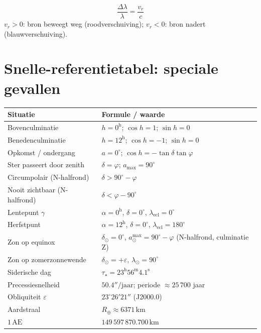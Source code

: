 \documentclass[11pt, a4paper]{article}
\newcommand{\graden}{^{\circ}}
\newcommand{\boogmin}{'}
\newcommand{\boogsec}{''}
\newcommand{\zon}{\odot}
\begin{document}
\begin{formule}
\[
  \frac{\Delta\lambda}{\lambda} = \frac{v_r}{c}
\]
$v_r > 0$: bron beweegt weg (roodverschuiving); $v_r < 0$: bron nadert (blauwverschuiving).
\end{formule}

\section{Snelle-referentietabel: speciale gevallen}

\begin{center}
\renewcommand{\arraystretch}{1.5}
\begin{tabular}{p{5.5cm} p{8cm}}
\toprule
\textbf{Situatie} & \textbf{Formule / waarde} \\
\midrule
Bovenculminatie           & $h = 0^\mathrm{h}$;\; $\cos h = 1$;\; $\sin h = 0$ \\
Benedenculminatie         & $h = 12^\mathrm{h}$;\; $\cos h = -1$;\; $\sin h = 0$ \\
Opkomst / ondergang       & $a = 0\graden$;\; $\cos h = -\tan\delta\tan\varphi$ \\
Ster passeert door zenith & $\delta = \varphi$;\; $a_\mathrm{max} = 90\graden$ \\
Circumpolair (N-halfrond) & $\delta > 90\graden - \varphi$ \\
Nooit zichtbaar (N-halfrond) & $\delta < \varphi - 90\graden$ \\
\midrule
Lentepunt $\gamma$  & $\alpha = 0^\mathrm{h}$,\; $\delta = 0\graden$,\; $\lambda_\mathrm{ecl} = 0\graden$ \\
Herfstpunt          & $\alpha = 12^\mathrm{h}$,\; $\delta = 0\graden$,\; $\lambda_\mathrm{ecl} = 180\graden$ \\
Zon op equinox      & $\delta_\zon = 0\graden$,\; $a_\zon^\mathrm{max} = 90\graden - \varphi$ (N-halfrond, culminatie Z) \\
Zon op zomerzonnewende & $\delta_\zon = +\varepsilon$,\; $\lambda_\zon = 90\graden$ \\
\midrule
Siderische dag           & $\tau_\star = 23^\mathrm{h}56^\mathrm{m}4.1^\mathrm{s}$ \\
Precessiesnelheid        & $50.4\boogsec/\mathrm{jaar}$;\; periode $\approx 25\,700$ jaar \\
Obliquiteit $\varepsilon$ & $23\graden26\boogmin21\boogsec$ (J2000.0) \\
Aardstraal               & $R_\oplus \approx 6371\,\mathrm{km}$ \\
$1\,\mathrm{AE}$         & $149\,597\,870.700\,\mathrm{km}$ \\
\bottomrule
\end{tabular}
\end{center}
\end{document}
